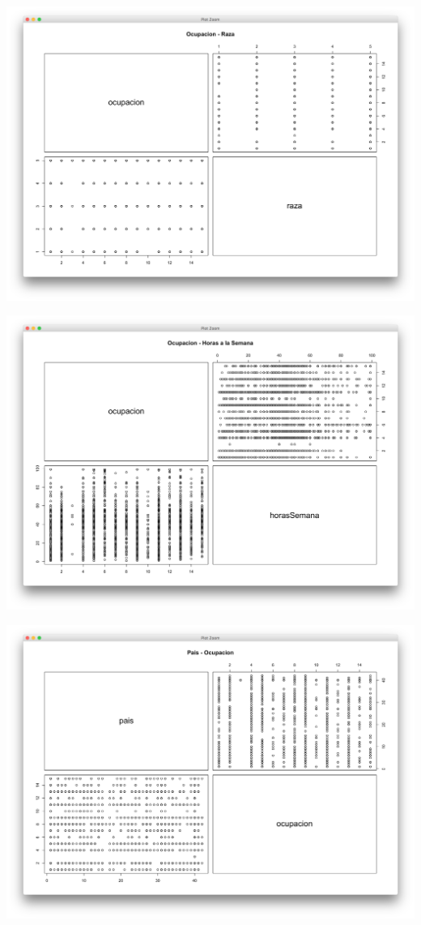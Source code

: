 \documentclass{article}
\begin{document}
  \begin{center}
    \hbox{\hspace{-5.5em}\includegraphics[scale=0.45]{graficas/ocupacion-raza}}
  \end{center}
  \begin{center}
    \hbox{\hspace{-5.5em}\includegraphics[scale=0.45]{graficas/ocupacionHoras}}
  \end{center}
  \begin{center}
    \hbox{\hspace{-5.5em}\includegraphics[scale=0.45]{graficas/pais-ocupacion}}
  \end{center}
\end{document}
